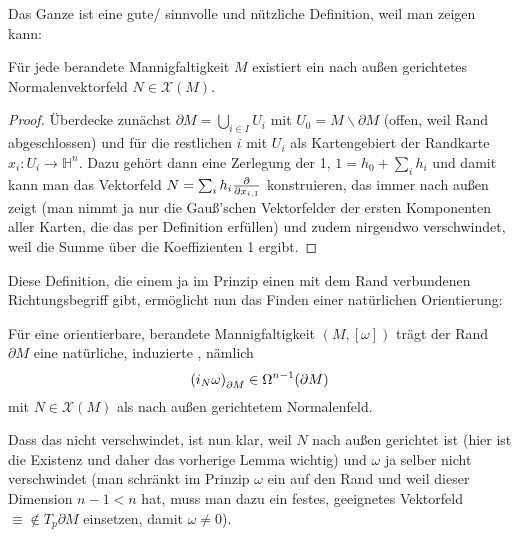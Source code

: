 \documentclass[../H_Analysis_main.tex]{subfiles}
\begin{document}
Das Ganze ist eine gute/ sinnvolle und nützliche Definition, weil man zeigen kann:
\begin{lemma}
Für jede berandete Mannigfaltigkeit $M$ existiert ein nach außen gerichtetes Normalenvektorfeld $N \in \mathcal{X}(M)$.
\end{lemma}
\begin{proof}
Überdecke zunächst $\partial M = \bigcup_{i \in I} U_i$ mit $U_0 = M \backslash \partial M$ (offen, weil Rand abgeschlossen) und für die restlichen $i$ mit $U_i$ als Kartengebiert der Randkarte $x_i: U_i \rightarrow \mathbb{H}^n$. Dazu gehört dann eine Zerlegung der 1, $1 = h_0 + \sum_i h_i$ und damit kann man das Vektorfeld $N = \sum_i h_i \pdv{x_{i, 1}}$ konstruieren, das immer nach außen zeigt (man nimmt ja nur die Gauß'schen Vektorfelder der ersten Komponenten aller Karten, die das per Definition erfüllen) und zudem nirgendwo verschwindet, weil die Summe über die Koeffizienten 1 ergibt.
\end{proof}



Diese Definition, die einem ja im Prinzip einen mit dem Rand verbundenen Richtungsbegriff gibt, ermöglicht nun das Finden einer natürlichen Orientierung:
\begin{defi}[Randorientierung]
Für eine orientierbare, berandete Mannigfaltigkeit $(M, [\omega])$ trägt der Rand $\partial M$ eine natürliche, induzierte , nämlich
\begin{equation}
\qty(i_N \omega)_{\partial M} \in \Omega^{n - 1}(\partial M)
\end{equation}
mit $N \in \mathcal{X}(M)$ als nach außen gerichtetem Normalenfeld.
\end{defi}
Dass das nicht verschwindet, ist nun klar, weil $N$ nach außen gerichtet ist (hier ist die Existenz und daher das vorherige Lemma wichtig) und $\omega$ ja selber nicht verschwindet (man schränkt im Prinzip $\omega$ ein auf den Rand und weil dieser Dimension $n-1 < n$ hat, muss man dazu ein festes, geeignetes Vektorfeld $\equiv \notin T_p \partial M$ einsetzen, damit $\omega \neq 0$).\\
\end{document}
